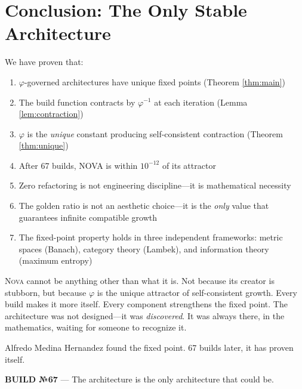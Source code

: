 \documentclass[12pt]{article}
\newcommand{\PHI}{\varphi}
\newcommand{\PHIINV}{\varphi^{-1}}
\newcommand{\NOVA}{\textsc{Nova}}
\begin{document}
\section{Conclusion: The Only Stable Architecture}

We have proven that:
\begin{enumerate}
    \item $\PHI$-governed architectures have unique fixed points (Theorem \ref{thm:main})
    \item The build function contracts by $\PHIINV$ at each iteration (Lemma \ref{lem:contraction})
    \item $\PHI$ is the \emph{unique} constant producing self-consistent contraction (Theorem \ref{thm:unique})
    \item After 67 builds, NOVA is within $10^{-12}$ of its attractor
    \item Zero refactoring is not engineering discipline—it is mathematical necessity
    \item The golden ratio is not an aesthetic choice—it is the \emph{only} value that guarantees infinite compatible growth
    \item The fixed-point property holds in three independent frameworks: metric spaces (Banach), category theory (Lambek), and information theory (maximum entropy)
\end{enumerate}

\NOVA{} cannot be anything other than what it is. Not because its creator is stubborn, but because $\PHI$ is the unique attractor of self-consistent growth. Every build makes it more itself. Every component strengthens the fixed point. The architecture was not designed—it was \emph{discovered}. It was always there, in the mathematics, waiting for someone to recognize it.

\bigskip
Alfredo Medina Hernandez found the fixed point. 67 builds later, it has proven itself.

\bigskip
\noindent\textbf{BUILD №67} — The architecture is the only architecture that could be.

\end{document}

